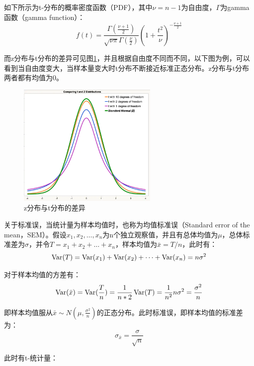 \documentclass[11pt]{article}
\begin{document}
如下所示为t-分布的概率密度函数（PDF），其中$\nu=n-1$为自由度，$\Gamma$为gamma函数（gamma function）：
\begin{equation*}
    f(t) = \frac{\Gamma\left( \frac{\nu+1}{2} \right)}{\sqrt{\nu\pi} \Gamma\left( \frac{\nu}{2} \right)} \left( 1+\frac{t^2}{\nu} \right)^{-\frac{\nu+1}{2}}
\end{equation*}

而z分布与t分布的差异可见图\ref{fig:z-and-t-dist}，并且根据自由度不同而不同，以下图为例，可以看到当自由度变大，当样本量变大时t分布不断接近标准正态分布。z分布与t分布两者都有均值为$0$。
\begin{figure}[ht!]
    \centering
    \includegraphics[width=0.6\textwidth]{fig/z-dist-and-t-dist.png}
    \caption{z分布与t分布的差异}
    \label{fig:z-and-t-dist}
\end{figure}

\begin{remark}
    关于标准误，当统计量为样本均值时，也称为均值标准误（Standard error of the mean，SEM）。假设$x_1,x_2,\dots,x_n$为n个独立观察值，并且有总体均值为$\mu$，总体标准差为$\sigma$，并令$T = x_1 + x_2 + \dots + x_n$，样本均值为$\bar{x} = T/n$，此时有：
    \begin{equation*}
        \operatorname{Var}(T) = \operatorname{Var}(x_1) + \operatorname{Var}(x_2) + \dots + \operatorname{Var}(x_n) = n \sigma^2
    \end{equation*}
    
    对于样本均值的方差有：
    \begin{equation*}
        \operatorname{Var}(\bar{x}) = \operatorname{Var}(\frac{T}{n}) = \frac{1}{n*2} \operatorname{Var}(T) = \frac{1}{n^2} n\sigma^2 = \frac{\sigma^2}{n}
    \end{equation*}

    即样本均值服从$\bar{x}\sim N(\mu,\frac{\sigma^2}{n})$的正态分布。此时标准误，即样本均值的标准差为：
    \begin{equation*}
        \sigma_{\bar{x}} = \frac{\sigma}{\sqrt{n}}
    \end{equation*}
    
    此时有t-统计量：
\end{remark}
\end{document}
